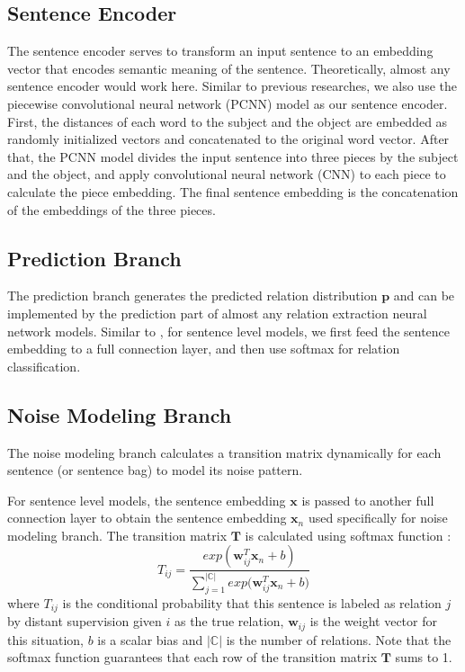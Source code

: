 \subsection{Sentence Encoder}
The sentence encoder serves to transform an input sentence to an embedding vector that encodes semantic meaning of the sentence. Theoretically, almost any sentence encoder would work here. Similar to previous researches, we also use the piecewise convolutional neural network (PCNN) model \cite{zeng2015distant} as our sentence encoder. First, the distances of each word to the subject and the object are embedded as randomly initialized vectors and concatenated to the original word vector. After that, the PCNN model divides the input sentence into three pieces by the subject and the object, and apply convolutional neural network (CNN) to each piece to calculate the piece embedding. The final sentence embedding is the concatenation of the embeddings of the three pieces.

\subsection{Prediction Branch}
The prediction branch generates the predicted relation distribution $\mathbf{p}$ and can be implemented by the prediction part of almost any relation extraction neural network models. Similar to \cite{luo2016temporal}, for sentence level models, we first feed the sentence embedding to a full connection layer, and then use softmax for relation classification.

\subsection{Noise Modeling Branch}
The noise modeling branch calculates a transition matrix dynamically for each sentence (or sentence bag) to model its noise pattern.

For sentence level models, the sentence embedding $\mathbf{x}$ is passed to another full connection layer to obtain the sentence embedding $\mathbf{x}_n$ used specifically for noise modeling branch. The transition matrix $\mathbf{T}$ is calculated using softmax function :
\begin{equation}
T_{ij} = \frac{exp({\mathbf{w}_{ij}^T \mathbf{x}_n + b})}{\sum_{j=1}^{|\mathbb{C}|}{exp({\mathbf{w}_{ij}^T \mathbf{x}_n + b}})}
\end{equation}
where $T_{ij}$ is the conditional probability that this sentence is labeled as relation $j$ by distant supervision given $i$ as the true relation, $\mathbf{w}_{ij}$ is the weight vector for this situation, $b$ is a scalar bias and $|\mathbb{C}|$ is the number of relations. Note that the softmax function guarantees that each row of the transition matrix $\mathbf{T}$ sums to 1.

